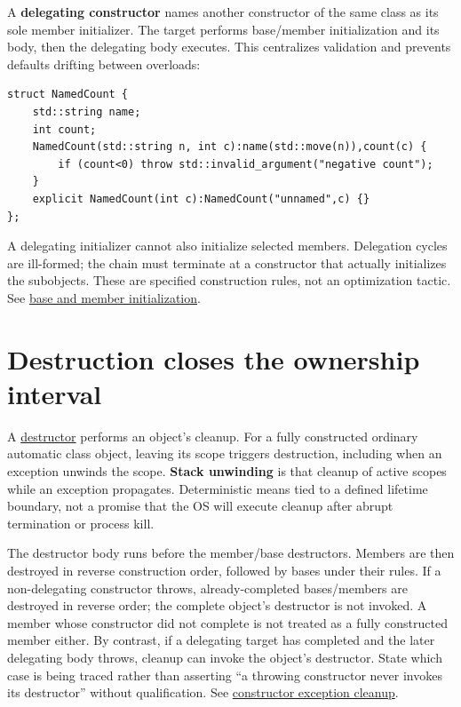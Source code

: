 A \textbf{delegating constructor} names another constructor of the same class as its sole member initializer. The target performs base/member initialization and its body, then the delegating body executes. This centralizes validation and prevents defaults drifting between overloads:

\begin{verbatim}
struct NamedCount {
    std::string name;
    int count;
    NamedCount(std::string n, int c):name(std::move(n)),count(c) {
        if (count<0) throw std::invalid_argument("negative count");
    }
    explicit NamedCount(int c):NamedCount("unnamed",c) {}
};
\end{verbatim}

A delegating initializer cannot also initialize selected members. Delegation cycles are ill-formed; the chain must terminate at a constructor that actually initializes the subobjects. These are specified construction rules, not an optimization tactic. See \href{https://eel.is/c++draft/class.base.init}{base and member initialization}.

\section{Destruction closes the ownership interval}\label{01-foundations-i-ch003-destruction-closes-the-ownership-interval}

A \hyperref[appendix-9bfe377cef7a]{destructor} performs an object's cleanup. For a fully constructed ordinary automatic class object, leaving its scope triggers destruction, including when an exception unwinds the scope. \textbf{Stack unwinding} is that cleanup of active scopes while an exception propagates. Deterministic means tied to a defined lifetime boundary, not a promise that the OS will execute cleanup after abrupt termination or process kill.

The destructor body runs before the member/base destructors. Members are then destroyed in reverse construction order, followed by bases under their rules. If a non-delegating constructor throws, already-completed bases/members are destroyed in reverse order; the complete object's destructor is not invoked. A member whose constructor did not complete is not treated as a fully constructed member either. By contrast, if a delegating target has completed and the later delegating body throws, cleanup can invoke the object's destructor. State which case is being traced rather than asserting ``a throwing constructor never invokes its destructor'' without qualification. See \href{https://eel.is/c++draft/except.ctor}{constructor exception cleanup}.

